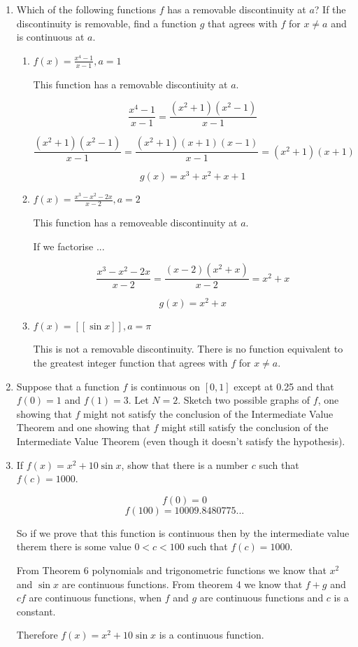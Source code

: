 \documentclass{article}
\begin{document}
\begin{enumerate}
			\item Which of the following functions $f$ has a removable discontinuity at $a$?
				If the discontinuity is removable, find a function $g$ that agrees with $f$
				for $x \neq a$ and is continuous at $a$.

			\begin{enumerate}
				\item $f(x) = \frac{x^4 - 1}{x-1}, a = 1$
				
				This function has a removable discontiuity at $a$.

				$$\frac{x^4 - 1}{x-1} = \frac{(x^2 + 1)(x^2 - 1)}{x-1}$$

				$$\frac{(x^2+1)(x^2-1)}{x-1} = \frac{(x^2+1)(x+1)(x-1)}{x-1} = (x^2+1)(x+1)$$

				$$g(x) = x^3 + x^2 + x + 1$$ 

				\item $f(x) = \frac{x^3 - x^2 - 2x}{x-2}, a = 2$

				This function has a removeable discontinuity at $a$.

				If we factorise ...

				$$\frac{x^3 - x^2 - 2x}{x-2} = \frac{(x-2)(x^2 + x)}{x-2} = x^2 + x$$

				$$g(x) = x^2 + x$$	

				\item $f(x) = [[\sin x]], a = \pi$

				This is not a removable discontinuity. There is no function equivalent
				to the greatest integer function that agrees with $f$ for $x \neq a$.	
			\end{enumerate}

			\item Suppose that a function $f$ is continuous on $[0, 1]$ except at 0.25
				and that $f(0) = 1$ and $f(1) = 3$. Let $N = 2$. Sketch two possible
				graphs of $f$, one showing that $f$ might not satisfy the conclusion
				of the Intermediate Value Theorem and one showing that $f$ might still
				satisfy the conclusion of the Intermediate Value Theorem (even though
				it doesn't satisfy the hypothesis).


			\item If $f(x) = x^2 + 10 \sin x$, show that there is a number $c$ such that
				$f(c) = 1000$.

			$$f(0) = 0$$
			$$f(100) = 10009.8480775...$$

			So if we prove that this function is continuous then by the intermediate value
			therem there is some value $0 < c < 100$ such that $f(c) = 1000$.

			From Theorem 6 polynomials and trigonometric functions we know that $x^2$
			and $\sin x$ are continuous functions. From theorem 4 we know that 
			$f + g$ and $cf$ are continuous functions, when $f$ and $g$ are continuous
			functions and $c$ is a constant.

			Therefore $f(x) = x^2 + 10\sin x$ is a continuous function.	
	\end{enumerate}
\end{document}
